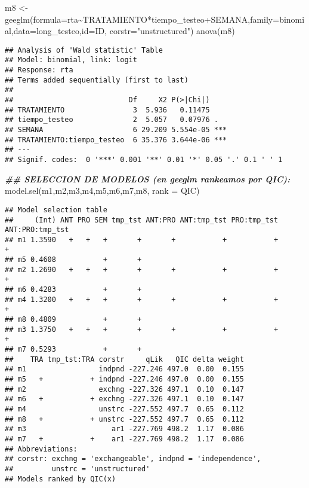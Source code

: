 \documentclass[
]{article}
\newenvironment{Shaded}{\begin{snugshade}}{\end{snugshade}}
\newcommand{\AttributeTok}[1]{\textcolor[rgb]{0.77,0.63,0.00}{#1}}
\newcommand{\DocumentationTok}[1]{\textcolor[rgb]{0.56,0.35,0.01}{\textbf{\textit{#1}}}}
\newcommand{\FunctionTok}[1]{\textcolor[rgb]{0.00,0.00,0.00}{#1}}
\newcommand{\NormalTok}[1]{#1}
\newcommand{\OtherTok}[1]{\textcolor[rgb]{0.56,0.35,0.01}{#1}}
\newcommand{\SpecialCharTok}[1]{\textcolor[rgb]{0.00,0.00,0.00}{#1}}
\newcommand{\StringTok}[1]{\textcolor[rgb]{0.31,0.60,0.02}{#1}}
\begin{document}
\begin{Shaded}
\begin{Highlighting}[]
\NormalTok{m8 }\OtherTok{\textless{}{-}} \FunctionTok{geeglm}\NormalTok{(}\AttributeTok{formula=}\NormalTok{rta}\SpecialCharTok{\textasciitilde{}}\NormalTok{TRATAMIENTO}\SpecialCharTok{*}\NormalTok{tiempo\_testeo}\SpecialCharTok{+}\NormalTok{SEMANA,}\AttributeTok{family=}\NormalTok{binomial,}\AttributeTok{data=}\NormalTok{long\_testeo,}\AttributeTok{id=}\NormalTok{ID,}
             \AttributeTok{corstr=}\StringTok{"unstructured"}\NormalTok{)}
\FunctionTok{anova}\NormalTok{(m8)}
\end{Highlighting}
\end{Shaded}

\begin{verbatim}
## Analysis of 'Wald statistic' Table
## Model: binomial, link: logit
## Response: rta
## Terms added sequentially (first to last)
## 
##                           Df     X2 P(>|Chi|)    
## TRATAMIENTO                3  5.936   0.11475    
## tiempo_testeo              2  5.057   0.07976 .  
## SEMANA                     6 29.209 5.554e-05 ***
## TRATAMIENTO:tiempo_testeo  6 35.376 3.644e-06 ***
## ---
## Signif. codes:  0 '***' 0.001 '**' 0.01 '*' 0.05 '.' 0.1 ' ' 1
\end{verbatim}

\begin{Shaded}
\begin{Highlighting}[]
\DocumentationTok{\#\# SELECCION DE MODELOS (en geeglm rankeamos por QIC):}
\FunctionTok{model.sel}\NormalTok{(m1,m2,m3,m4,m5,m6,m7,m8, }\AttributeTok{rank =}\NormalTok{ QIC)}
\end{Highlighting}
\end{Shaded}

\begin{verbatim}
## Model selection table 
##     (Int) ANT PRO SEM tmp_tst ANT:PRO ANT:tmp_tst PRO:tmp_tst ANT:PRO:tmp_tst
## m1 1.3590   +   +   +       +       +           +           +               +
## m5 0.4608           +       +                                                
## m2 1.2690   +   +   +       +       +           +           +               +
## m6 0.4283           +       +                                                
## m4 1.3200   +   +   +       +       +           +           +               +
## m8 0.4809           +       +                                                
## m3 1.3750   +   +   +       +       +           +           +               +
## m7 0.5293           +       +                                                
##    TRA tmp_tst:TRA corstr     qLik   QIC delta weight
## m1                 indpnd -227.246 497.0  0.00  0.155
## m5   +           + indpnd -227.246 497.0  0.00  0.155
## m2                 exchng -227.326 497.1  0.10  0.147
## m6   +           + exchng -227.326 497.1  0.10  0.147
## m4                 unstrc -227.552 497.7  0.65  0.112
## m8   +           + unstrc -227.552 497.7  0.65  0.112
## m3                    ar1 -227.769 498.2  1.17  0.086
## m7   +           +    ar1 -227.769 498.2  1.17  0.086
## Abbreviations:
## corstr: exchng = 'exchangeable', indpnd = 'independence', 
##         unstrc = 'unstructured'
## Models ranked by QIC(x)
\end{verbatim}
\end{document}

